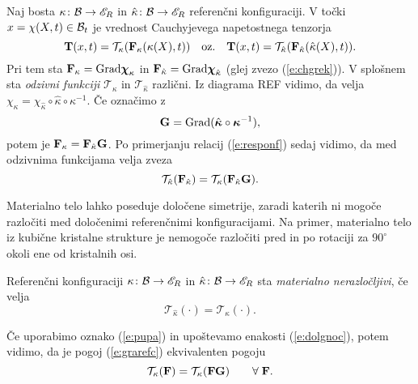 Naj bosta $\kappa\colon\mathcal B\to\mathscr E_R$ in $\hat{\kappa}\colon\mathcal B\to\mathscr E_R$ referenčni konfiguraciji.
V točki $x=\chi(X,t)\in\mathcal B_t$ je vrednost Cauchyjevega napetostnega tenzorja
\begin{equation} \label{e:responf}
	\mathbf T(x,t)=\mathcal{T}_{\kappa}(\mathbf F_{\kappa}(\kappa(X),t))\quad\textrm{oz.}\quad
	\mathbf T(x,t)=\mathcal{T}_{\hat{\kappa}}(\mathbf F_{\hat{\kappa}}(\hat{\kappa}(X),t)).
\end{equation}
Pri tem sta $\mathbf F_{\kappa}=\mathrm{Grad}\boldsymbol \chi_{\kappa}$ in
$\mathbf F_{\hat{\kappa}}=\mathrm{Grad}\boldsymbol \chi_{\hat{\kappa}}$ (glej zvezo (\ref{e:chgrek})).
V splošnem sta \emph{odzivni funkciji} $\mathcal{T}_{\kappa}$ in $\mathcal{T}_{\hat{\kappa}}$
različni. Iz diagrama REF vidimo, da velja $\chi_{\kappa}=\chi_{\hat{\kappa}}\circ\hat{\kappa}\circ\kappa^{-1}$.
Če označimo z
\begin{equation} \label{e:pupa}
	\mathbf G=\mathrm{Grad}(\hat{\boldsymbol \kappa}\circ\boldsymbol \kappa^{-1}),
\end{equation}
potem je $\mathbf F_{\kappa}=\mathbf F_{\hat{\kappa}}\mathbf G$. Po primerjanju relacij (\ref{e:responf})
sedaj vidimo, da med odzivnima funkcijama velja zveza
\begin{equation} \label{e:dolgnoc}
	\mathcal{T}_{\hat{\kappa}}(\mathbf F_{\hat{\kappa}})
	=\mathcal{T}_{\kappa}(\mathbf F_{\hat{\kappa}}\mathbf G).
\end{equation}

Materialno telo lahko poseduje določene simetrije, zaradi katerih ni mogo\-če razločiti
med določenimi referenčnimi konfiguracijami. Na primer, materialno telo iz
kubične kristalne strukture je nemogoče razločiti pred in po rotaciji za
$90^{\circ}$ okoli ene od kristalnih osi.

\begin{definicija}
	Referenčni konfiguraciji $\kappa\colon\mathcal B\to\mathscr E_R$ in $\hat{\kappa}\colon\mathcal B\to\mathscr E_R$
	sta \emph{materialno nerazločljivi}, če velja
	\begin{equation} \label{e:grarefc}
		\mathcal{T}_{\hat{\kappa}}(\cdot)=\mathcal{T}_{\kappa}(\cdot).
	\end{equation}
\end{definicija}

Če uporabimo oznako (\ref{e:pupa}) in upoštevamo enakosti (\ref{e:dolgnoc}),
potem vidimo, da je pogoj (\ref{e:grarefc}) ekvivalenten pogoju
\begin{equation} \label{e:pogir}
	\mathcal{T}_{\kappa}(\mathbf F)=\mathcal{T}_{\kappa}(\mathbf F\mathbf G)\qquad
	\forall\;\mathbf F.
\end{equation}

